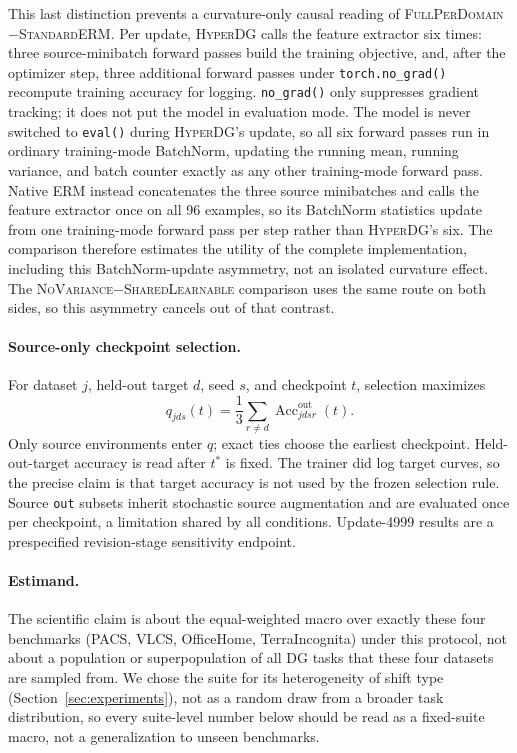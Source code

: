 \documentclass[10pt]{article}
\newcommand{\method}{\textsc{HyperDG}}
\newcommand{\full}{\textsc{FullPerDomain}}
\newcommand{\erm}{\textsc{StandardERM}}
\newcommand{\shared}{\textsc{SharedLearnable}}
\newcommand{\novar}{\textsc{NoVariance}}
\begin{document}
This last distinction prevents a curvature-only causal reading of
\full{}$-$\erm{}. Per update, \method{} calls the feature extractor six times:
three source-minibatch forward passes build the training objective, and,
after the optimizer step, three additional forward passes under
\texttt{torch.no\_grad()} recompute training accuracy for logging.
\texttt{no\_grad()} only suppresses gradient tracking; it does not put the
model in evaluation mode. The model is never switched to \texttt{eval()}
during \method{}'s update, so all six forward passes run in ordinary
training-mode BatchNorm, updating the running mean, running variance, and
batch counter exactly as any other training-mode forward pass. Native ERM
instead concatenates the three source minibatches and calls the feature
extractor once on all 96 examples, so its BatchNorm statistics update from one
training-mode forward pass per step rather than \method{}'s six. The
comparison therefore estimates the utility of the complete
implementation, including this BatchNorm-update asymmetry, not an isolated
curvature effect. The \novar{}$-$\shared{} comparison uses the same route on
both sides, so this asymmetry cancels out of that contrast.

\paragraph{Source-only checkpoint selection.}
For dataset $j$, held-out target $d$, seed $s$, and checkpoint $t$, selection
maximizes
\begin{equation}
q_{jds}(t)=\frac{1}{3}\sum_{r\neq d}
\operatorname{Acc}^{\mathrm{out}}_{jdsr}(t).
\label{eq:selection}
\end{equation}
Only source environments enter $q$; exact ties choose the earliest checkpoint.
Held-out-target accuracy is read after $t^*$ is fixed. The trainer did log
target curves, so the precise claim is that target accuracy is not used by the
frozen selection rule. Source \texttt{out} subsets inherit stochastic source
augmentation and are evaluated once per checkpoint, a limitation shared by
all conditions. Update-4999 results are a prespecified revision-stage
sensitivity endpoint.

\paragraph{Estimand.}
The scientific claim is about the equal-weighted macro over exactly these four
benchmarks (PACS, VLCS, OfficeHome, TerraIncognita) under this protocol, not
about a population or superpopulation of all DG tasks that these four
datasets are sampled from. We chose the suite for its heterogeneity of shift
type (Section~\ref{sec:experiments}), not as a random draw from a broader task
distribution, so every suite-level number below should be read as a
fixed-suite macro, not a generalization to unseen benchmarks.
\end{document}
